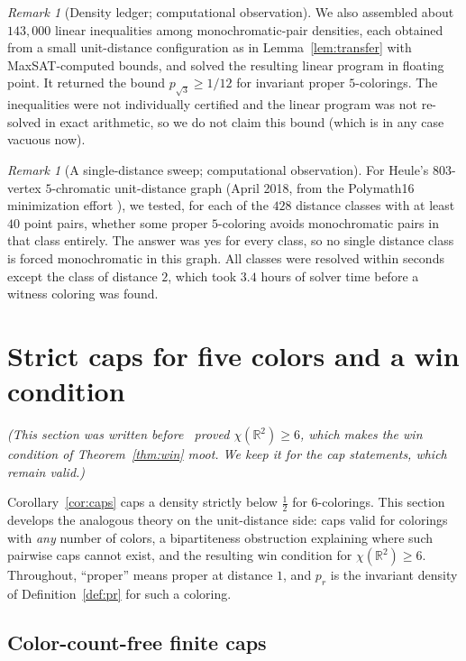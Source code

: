 \documentclass[11pt]{article}
\theoremstyle{definition}
\theoremstyle{remark}
\newtheorem{remark}[theorem]{Remark}
\newcommand{\R}{\mathbb{R}}
\begin{document}
\begin{remark}[Density ledger; computational observation]
\label{rem:ledger}
We also assembled about $143{,}000$ linear inequalities among
monochromatic-pair densities, each obtained from a small unit-distance
configuration as in Lemma~\ref{lem:transfer} with MaxSAT-computed
bounds, and solved the resulting linear program in floating point.  It
returned the bound $p_{\sqrt3}\ge1/12$ for invariant proper
$5$-colorings.  The inequalities were not individually certified and the
linear program was not re-solved in exact arithmetic, so we do not claim
this bound (which is in any case vacuous now).
\end{remark}

\begin{remark}[A single-distance sweep; computational observation]
\label{rem:wall}
For Heule's $803$-vertex $5$-chromatic unit-distance graph (April
2018, from the Polymath16 minimization effort
\cite{Polymath16,Heule18}), we tested, for each of the $428$ distance classes with at
least $40$ point pairs, whether some proper $5$-coloring avoids
monochromatic pairs in that class entirely.  The answer was yes for
every class, so no single distance class is forced monochromatic in
this graph.  All classes were resolved within seconds except the class
of distance $2$, which took $3.4$ hours of solver time before a witness
coloring was found.
\end{remark}

\section{Strict caps for five colors and a win condition}\label{sec:k5caps}

\emph{(This section was written before~\cite{OAI} proved
$\chi(\R^2)\ge6$, which makes the win condition of
Theorem~\ref{thm:win} moot.  We keep it for the cap statements, which
remain valid.)}

Corollary~\ref{cor:caps} caps a density strictly below $\tfrac12$ for
$6$-colorings.  This section develops the analogous theory on the
unit-distance side: caps valid for colorings with \emph{any} number of
colors, a bipartiteness obstruction explaining where such pairwise caps
cannot exist, and the resulting win condition for $\chi(\R^2)\ge6$.
Throughout, ``proper'' means proper at distance $1$, and $p_r$ is the
invariant density of Definition~\ref{def:pr} for such a coloring.

\subsection{Color-count-free finite caps}
\end{document}
